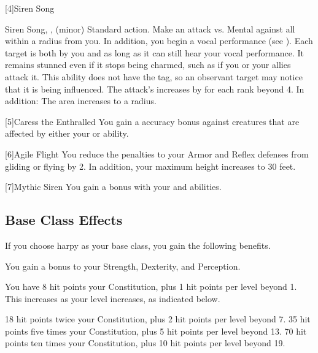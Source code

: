       [4]{Siren Song}
      \begin{magicalsustainability}{Siren Song}{, ,  (minor)}
        \abilityusagetime Standard action.
        \rankline
        Make an attack vs. Mental against all  within a \medarea radius from you.
        In addition, you begin a vocal performance (see ).
        \hit Each target is both \charmed by you and \stunned as long as it can still hear your vocal performance.
        It remains stunned even if it stops being charmed, such as if you or your allies attack it.
        This ability does not have the  tag, so an observant target may notice that it is being influenced.
        \rankline
        The attack's  increases by  for each rank beyond 4.
        In addition:
         The area increases to a \largearea radius.
      \end{magicalsustainability}

    [5]{Caress the Enthralled} You gain a  accuracy bonus against creatures that are affected by either your  or  ability.

    [6]{Agile Flight} You reduce the penalties to your Armor and Reflex defenses from gliding or flying by 2.
    In addition, your maximum height increases to 30 feet.

    [7]{Mythic Siren} You gain a   bonus with your  and  abilities.

  \subsection{Base Class Effects}
    If you choose harpy as your base class, you gain the following benefits.

     You gain a  bonus to your Strength, Dexterity, and Perception.

      You have 8 hit points \add  your Constitution, plus 1 hit points per level beyond 1.
      This increases as your level increases, as indicated below.
      \begin{itemize}
         18 hit points \add twice your Constitution, plus 2 hit points per level beyond 7.
         35 hit points \add five times your Constitution, plus 5 hit points per level beyond 13.
         70 hit points \add ten times your Constitution, plus 10 hit points per level beyond 19.
      \end{itemize}

